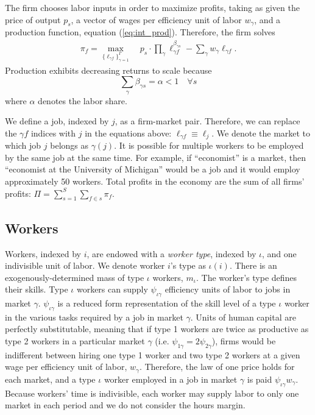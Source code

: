 \documentclass[12pt]{article}
\def\ig{\iota\gamma}
\def\g{\gamma}
\def\i{\iota}
\theoremstyle{definition}
\theoremstyle{plain}
\begin{document}
% 

The firm chooses labor inputs in order to maximize profits, taking as given the price of output $p_s$, a vector of wages per efficiency unit of labor $w_{\g}$, and a production function, equation (\ref{eq:int_prod}). Therefore, the firm solves
\begin{align}
\pi_f = \max_{ \{ \ell_{\g f} \}_{\g=1}^{\Gamma} } \quad  p_s \cdot   \prod_{\g} \ell_{\g f}^{\beta_{\g s}}  - \sum_{\g} w_{\g} \ell_{\g f} . \label{eq:int_profit_max}
\end{align}
Production exhibits decreasing returns to scale because
\[ \sum_{\g} \beta_{\g s} =\alpha < 1 \quad \forall s \]
where $\alpha$ denotes the labor share. 

We define a job, indexed by $j$, as a firm-market pair. Therefore, we can replace the $\g f$ indices with $j$ in the equations above: $\ell_{\g f} \equiv \ell_j$. We denote the market to which job $j$ belongs as $\g(j)$. It is possible for multiple workers to be employed by the same job at the same time. For example, if ``economist'' is a market, then ``economist at the University of Michigan'' would be a job and it would employ approximately 50 workers. Total profits in the economy are the sum of all firms' profits: $\Pi = \sum_{s=1}^S \sum_{f \in s} \pi_f$.


\subsection{Workers}

Workers, indexed by $i$, are endowed with a \emph{worker type}, indexed by $\i$, and one indivisible unit of labor. We denote worker $i$'s type as $\i(i)$. There is an exogenously-determined mass of type $\i$ workers, $m_\i$. The worker's type defines their skills. Type $\i$ workers can supply $\psi_{\ig}$ efficiency units of labor to jobs in market $\g$. $\psi_{\ig}$ is a reduced form representation of the skill level of a type $\i$ worker in the various tasks required by a job in market $\g$. Units of human capital are perfectly substitutable, meaning that if type 1 workers are twice as productive as type 2 workers in a particular market $\g$ (i.e. $\psi_{1\g} = 2\psi_{2\g}$), firms would be indifferent between hiring one type 1 worker and two type 2 workers at a given wage per efficiency unit of labor, $w_{\g}$. Therefore, the law of one price holds for each market, and a type $\i$ worker employed in a job in market $\g$ is paid $\psi_{\ig}w_{\g}$. Because workers' time is indivisible, each worker may supply labor to only one market in each period and we do not consider the hours margin.
\end{document}
